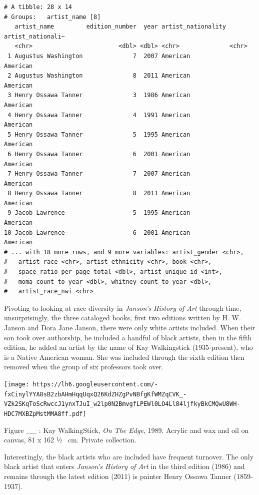 \documentclass[
  letterpaper,
  DIV=11,
  numbers=noendperiod]{scrreprt}
\begin{document}
\begin{verbatim}
# A tibble: 28 x 14
# Groups:   artist_name [8]
   artist_name         edition_number  year artist_nationality artist_nationali~
   <chr>                        <dbl> <dbl> <chr>              <chr>            
 1 Augustus Washington              7  2007 American           American         
 2 Augustus Washington              8  2011 American           American         
 3 Henry Ossawa Tanner              3  1986 American           American         
 4 Henry Ossawa Tanner              4  1991 American           American         
 5 Henry Ossawa Tanner              5  1995 American           American         
 6 Henry Ossawa Tanner              6  2001 American           American         
 7 Henry Ossawa Tanner              7  2007 American           American         
 8 Henry Ossawa Tanner              8  2011 American           American         
 9 Jacob Lawrence                   5  1995 American           American         
10 Jacob Lawrence                   6  2001 American           American         
# ... with 18 more rows, and 9 more variables: artist_gender <chr>,
#   artist_race <chr>, artist_ethnicity <chr>, book <chr>,
#   space_ratio_per_page_total <dbl>, artist_unique_id <int>,
#   moma_count_to_year <dbl>, whitney_count_to_year <dbl>,
#   artist_race_nwi <chr>
\end{verbatim}

Pivoting to looking at race diversity in \emph{Janson's History of Art}
through time, unsurprisingly, the three cataloged books, first two
editions written by H. W. Janson and Dora Jane Janson, there were only
white artists included. When their son took over authorship, he included
a handful of black artists, then in the fifth edition, he added an
artist by the name of Kay Walkingstick (1935-present), who is a Native
American woman. She was included through the sixth edition then removed
when the group of six professors took over.

\texttt{[image: https://lh6.googleusercontent.com/-fxCinylYYA8sB2zbAHmHqqUqxQ26KdZHZgPvNBfgKfWMZqCVK\_-VZk2SKqToScRwccJ1ynxTJuI\_w2lp0N2BmvgfLPEWl0LO4Ll84ljfkyBkCMQwU8WH-HDC7MXBZpMstMMA8ff.pdf]}

Figure \_\_ : Kay WalkingStick, \emph{On The Edge}, 1989. Acrylic and
wax and oil on canvas, 81 x 162 ½~ cm. Private collection.

Interestingly, the black artists who are included have frequent
turnover. The only black artist that enters \emph{Janson's History of
Art} in the third edition (1986) and remains through the latest edition
(2011) is painter Henry Ossawa Tanner (1859-1937).
\end{document}
